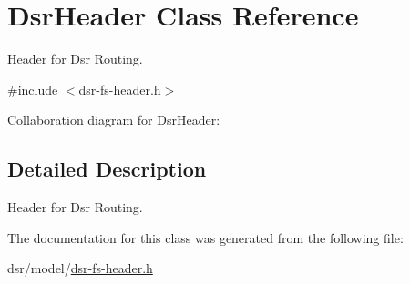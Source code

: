 \hypertarget{classDsrHeader}{}\section{Dsr\+Header Class Reference}
\label{classDsrHeader}


Header for Dsr Routing.  




{\ttfamily \#include $<$dsr-\/fs-\/header.\+h$>$}



Collaboration diagram for Dsr\+Header\+:


\subsection{Detailed Description}
Header for Dsr Routing. 

The documentation for this class was generated from the following file\+:\begin{DoxyCompactItemize}
\item 
dsr/model/\hyperlink{dsr-fs-header_8h}{dsr-\/fs-\/header.\+h}\end{DoxyCompactItemize}
